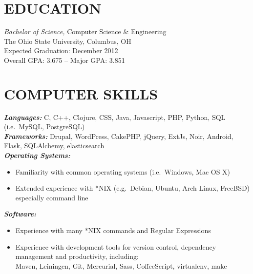 \documentclass[line,letterpaper]{resume}
\begin{document}

\address{2092 Middlesex road, Columbus, OH 43220}
\address{\href{mailto:ryan@ryanmcg.com}{ryan@ryanmcg.com} -- (614) 678-4408 --
\href{https://github.com/RyanMcG}{RyanMcG on GitHub}}


\begin{resume}
    \vspace{-24pt}
    \section{\uppercase{Education}} {\sl Bachelor of Science,} \/Computer
    Science \& Engineering \\
    The Ohio State University, Columbus, OH \\
    Expected Graduation: December 2012 \\
    Overall GPA: 3.675 -- Major GPA: 3.851 \\

    \vspace{-16pt}

    \section{\uppercase{Computer Skills}}
    {\sl\textbf{Languages:}}
    \/C, C++, Clojure, CSS, Java, Javascript, PHP, Python, SQL
    (i.e.~MySQL, PostgreSQL) \\
    {\sl\textbf{Frameworks:}} 
    \/Drupal, WordPress, CakePHP, jQuery, ExtJs, Noir, Android, Flask,
    SQLAlchemy, elasticsearch \\
    {\sl\textbf{Operating Systems: }} \hfill 
    \begin{itemize}
        \item Familiarity with common operating systems (i.e.~Windows, Mac OS X)
        \item Extended experience with *NIX (e.g.~Debian, Ubuntu, Arch Linux,
            FreeBSD) especially command line
    \end{itemize}
    {\sl\textbf{Software:}} \hfill 
    \begin{itemize}
        \item Experience with many *NIX commands and Regular Expressions
        \item Experience with development tools for version control, dependency
            management and productivity, including: \\
                Maven, Leiningen, Git, Mercurial, Sass, CoffeeScript,
                virtualenv, make\\
    \end{itemize}


\end{resume}
\end{document}
